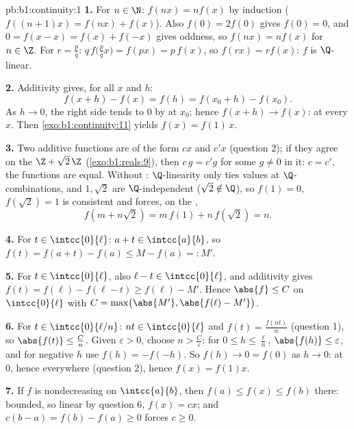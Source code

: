 \begin{solution}{pb:b1:continuity:1}
\textbf{1.} For $n \in \N$: $f(nx) = n f(x)$ by induction
($f((n+1)x) = f(nx) + f(x)$). Also $f(0) = 2f(0)$ gives $f(0) =
0$, and $0 = f(x - x) = f(x) + f(-x)$ gives oddness, so $f(nx) =
nf(x)$ for $n \in \Z$. For $r = \frac pq$: $q\,f\bigl(\tfrac
pq x\bigr) = f(px) = p\,f(x)$, so $f(rx) = r f(x)$: $f$ is
$\Q$-linear.

\textbf{2.} Additivity gives, for all $x$ and $h$:
\[
f(x + h) - f(x) = f(h) = f(x_0 + h) - f(x_0) .
\]
As $h \to 0$, the right side tends to $0$ by  at
$x_0$; hence $f(x + h) \to f(x)$:  at every $x$. Then
\cref{exo:b1:continuity:11} yields $f(x) = f(1)\,x$.

\textbf{3.} Two  additive functions are of the form
$cx$ and $c'x$ (question 2); if they agree on the  
$\Z + \sqrt2\,\Z$ (\cref{exo:b1:reals:9}), then $c\,g = c'g$ for
some $g \neq 0$ in it: $c = c'$, the functions are equal. Without
: $\Q$-linearity only ties values at
$\Q$-combinations, and $1, \sqrt2$ are $\Q$-independent ($\sqrt2
\notin \Q$), so $f(1) = 0$, $f(\sqrt2) = 1$ is consistent and
forces, on the ,
\[
f(m + n\sqrt2) = m\,f(1) + n\,f(\sqrt2) = n .
\]

\textbf{4.} For $t \in \intcc{0}{\ell}$: $a + t \in
\intcc{a}{b}$, so $f(t) = f(a + t) - f(a) \leq M - f(a) =: M'$.

\textbf{5.} For $t \in \intcc{0}{\ell}$, also $\ell - t \in
\intcc{0}{\ell}$, and additivity gives $f(t) = f(\ell) - f(\ell
- t) \geq f(\ell) - M'$. Hence $\abs{f} \leq C$ on
$\intcc{0}{\ell}$ with $C = \max\bigl(\abs{M'}, \abs{f(\ell) -
M'}\bigr)$.

\textbf{6.} For $t \in \intcc{0}{\ell/n}$: $nt \in
\intcc{0}{\ell}$ and $f(t) = \frac{f(nt)}{n}$ (question 1), so
$\abs{f(t)} \leq \frac Cn$. Given $\varepsilon > 0$, choose $n >
\frac C\varepsilon$: for $0 \leq h \leq \frac\ell n$,
$\abs{f(h)} \leq \varepsilon$, and for negative $h$ use $f(h) =
-f(-h)$. So $f(h) \to 0 = f(0)$ as $h \to 0$:  at $0$,
hence everywhere (question 2), hence $f(x) = f(1)x$.

\textbf{7.} If $f$ is nondecreasing on $\intcc{a}{b}$, then
$f(a) \leq f(x) \leq f(b)$ there: bounded, so linear by question
6, $f(x) = cx$; and $c(b - a) = f(b) - f(a) \geq 0$ forces $c
\geq 0$.


\end{solution}
